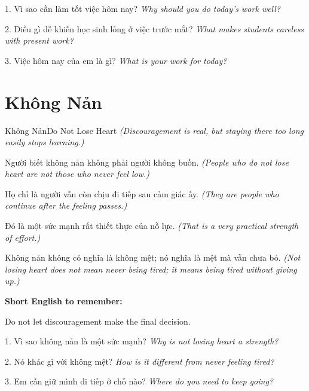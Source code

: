 \begin{tuhocnhanh}
1. Vì sao cần làm tốt việc hôm nay? \textit{Why should you do today's work well?}

2. Điều gì dễ khiến học sinh lỏng ở việc trước mắt? \textit{What makes students careless with present work?}

3. Việc hôm nay của em là gì? \textit{What is your work for today?}
\end{tuhocnhanh}
\ngancach

\section{Không Nản}
\begin{truyen}{Không Nản}{Do Not Lose Heart}
\textit{(Discouragement is real, but staying there too long easily stops learning.)}

Người biết không nản không phải người không buồn.
\textit{(People who do not lose heart are not those who never feel low.)}

Họ chỉ là người vẫn còn chịu đi tiếp sau cảm giác ấy.
\textit{(They are people who continue after the feeling passes.)}

Đó là một sức mạnh rất thiết thực của nỗ lực.
\textit{(That is a very practical strength of effort.)}
\end{truyen}

\begin{baihoc}
Không nản không có nghĩa là không mệt; nó nghĩa là mệt mà vẫn chưa bỏ.
\textit{(Not losing heart does not mean never being tired; it means being tired without giving up.)}
\end{baihoc}

\begin{ghinhoanh}
\textbf{Short English to remember:}

Do not let discouragement make the final decision.

\end{ghinhoanh}

\begin{tuhocnhanh}
1. Vì sao không nản là một sức mạnh? \textit{Why is not losing heart a strength?}

2. Nó khác gì với không mệt? \textit{How is it different from never feeling tired?}

3. Em cần giữ mình đi tiếp ở chỗ nào? \textit{Where do you need to keep going?}
\end{tuhocnhanh}
\ngancach

